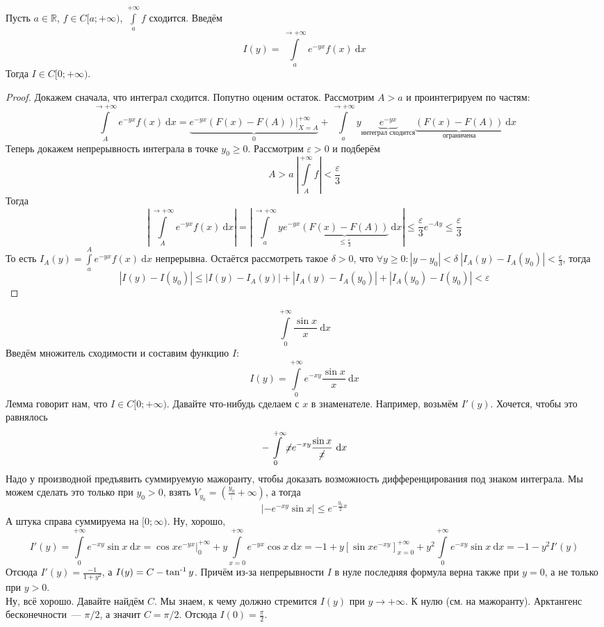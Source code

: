\documentclass{article}
\let\eps\varepsilon
\begin{document}
    \begin{lemma}
        Пусть $a\in\mathbb R$, $f\in C[a;+\infty)$, $\int\limits_a^{+\infty}f$ сходится. Введём
        $$
        I(y)=\int\limits_a^{\to+\infty}e^{-yx}f(x)~\mathrm dx
        $$
        Тогда $I\in C[0;+\infty)$.
    \end{lemma}
    \begin{proof}
        Докажем сначала, что интеграл сходится. Попутно оценим остаток. Рассмотрим $A>a$ и проинтегрируем по частям:
        $$
        \int\limits_A^{\to+\infty}e^{-yx}f(x)~\mathrm dx=\underbrace{e^{-yx}(F(x)-F(A))\bigg|_{X=A}^{+\infty}}_0+\int\limits_a^{\to+\infty}y\underbrace{e^{-yx}}_{\text{интеграл сходится}}\underbrace{(F(x)-F(A))}_{\text{ограничена}}~\mathrm dx
        $$
        Теперь докажем непрерывность интеграла в точке $y_0\geqslant0$. Рассмотрим $\eps>0$ и подберём
        $$
        A>a~\left|\int\limits_A^{+\infty}f\right|<\frac\eps3
        $$
        Тогда
        $$
        \left|\int\limits_A^{\to+\infty}e^{-yx}f(x)~\mathrm dx\right|=\left|\int\limits_a^{\to+\infty}ye^{-yx}\underbrace{(F(x)-F(A))}_{\leqslant\frac\eps3}~\mathrm dx\right|\leqslant\frac\eps3e^{-Ay}\leqslant\frac\eps3
        $$
        То есть $I_A(y)=\int\limits_a^Ae^{-yx}f(x)~\mathrm dx$ непрерывна. Остаётся рассмотреть такое $\delta>0$, что $\forall y\geqslant0:|y-y_0|<\delta~|I_A(y)-I_A(y_0)|<\frac\eps3$, тогда
        $$
        |I(y)-I(y_0)|\leqslant|I(y)-I_A(y)|+|I_A(y)-I_A(y_0)|+|I_A(y_0)-I(y_0)|<\eps
        $$
    \end{proof}
    \begin{example}
        $$
        \int\limits_0^{+\infty}\frac{\sin x}x~\mathrm dx
        $$
        Введём множитель сходимости и составим функцию $I$:
        $$
        I(y)=\int\limits_0^{+\infty}e^{-xy}\frac{\sin x}x~\mathrm dx
        $$
        Лемма говорит нам, что $I\in C[0;+\infty)$. Давайте что-нибудь сделаем с $x$ в знаменателе. Например, возьмём $I'(y)$. Хочется, чтобы это равнялось
        $$
        -\int\limits_0^{+\infty}\cancel{x}e^{-xy}\frac{\sin x}{\cancel{x}}~\mathrm dx
        $$
        Надо у производной предъявить суммируемую мажоранту, чтобы доказать возможность дифференцирования под знаком интеграла. Мы можем сделать это только при $y_0>0$, взять $V_{y_0}=\left(\frac{y_0};+\infty\right)$, а тогда
        $$
        \left|-e^{-xy}\sin x\right|\leqslant e^{-\frac{y_0}2x}
        $$
        А штука справа суммируема на $[0;\infty)$. Ну, хорошо,
        $$
        I'(y)=\int\limits_0^{+\infty}e^{-xy}\sin x~\mathrm dx=\cos xe^{-yx}\bigg|_0^{+\infty}+y\int\limits_{x=0}^{+\infty}e^{-yx}\cos x~\mathrm dx=
        -1+y\left[\sin xe^{-xy}\right]_{x=0}^{+\infty}+y^2\int\limits_0^{+\infty}e^{-xy}\sin x~\mathrm dx=-1-y^2I'(y)
        $$
        Отсюда $I'(y)=\frac{-1}{1+y^2}$, а $I(y)=C-\operatorname{\tan^{-1}} y$. Причём из-за непрерывности $I$ в нуле последняя формула верна также при $y=0$, а не только при $y>0$.\\
        Ну, всё хорошо. Давайте найдём $C$. Мы знаем, к чему должно стремится $I(y)$ при $y\to+\infty$. К нулю (см. на мажоранту). Арктангенс бесконечности~--- $\pi/2$, а значит $C=\pi/2$. Отсюда $I(0)=\frac\pi2$.
    \end{example}
\end{document}
